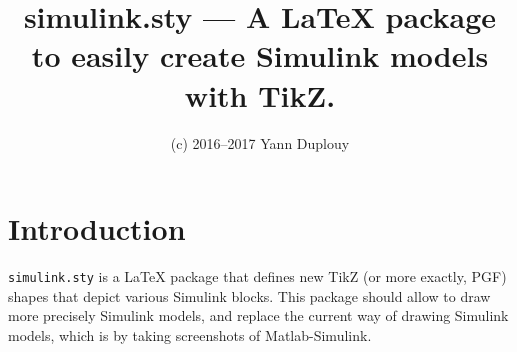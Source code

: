\documentclass[a4paper]{article}
\title{simulink.sty --- A \LaTeX{} package to easily create Simulink models
       with TikZ.\\ {\large \skstyversion}}
\author{(c) 2016--2017 Yann Duplouy}
\begin{document}
    \maketitle
    \vspace{-0.5cm}

    \tableofcontents
    \clearpage

\section{Introduction}
    {\tt simulink.sty} is a \LaTeX{} package that defines new TikZ (or more
exactly, PGF) shapes that depict various Simulink blocks. This package should
allow to draw more precisely Simulink models, and replace the current way of
drawing Simulink models, which is by taking screenshots of Matlab-Simulink.
\end{document}
